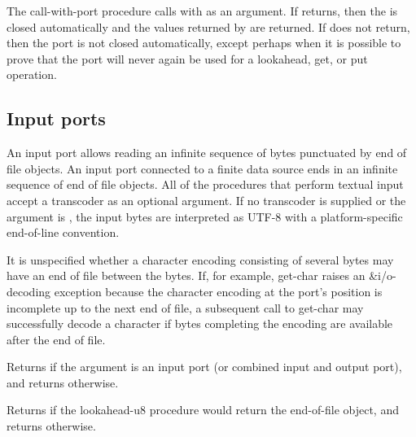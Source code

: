 \begin{entry}{%
}
   
  The {\cf call-with-port} procedure
calls  with  as an argument. If
 returns, then the  is closed automatically and
the values returned by  are returned. If  does not
return, then the port is not closed automatically, except perhaps when it is
possible to prove that the port will never again be used for a
{\cf lookahead}, {\cf get}, or {\cf put} operation.
\end{entry}

\subsection{Input ports}

An input port allows reading an infinite sequence of bytes punctuated
by end of file objects. An input port connected to a finite data
source ends in an infinite sequence of end of file objects.  All of
the procedures that perform textual input accept a transcoder as an
optional argument. If no transcoder is supplied or the
 argument is \schfalse{}, the input bytes are
interpreted as UTF-8 with a platform-specific end-of-line convention.

It is unspecified whether a character encoding consisting of several
bytes may have an end of file between the bytes.  If, for example,
{\cf get-char} raises an {\cf\&i/o-decoding} exception because the
character encoding at the port's position is incomplete up to the next
end of file, a subsequent call to {\cf get-char} may successfully
decode a character if bytes completing the encoding are available
after the end of file.

\begin{entry}{%
}

Returns \schtrue{} if the argument is an input port (or combined input
and output port), and returns \schfalse{} otherwise.
\end{entry}

\begin{entry}{%
}
   
Returns \schtrue{} if the {\cf lookahead-u8} procedure would return
the end-of-file object, and returns \schfalse{} otherwise.
\end{entry}

